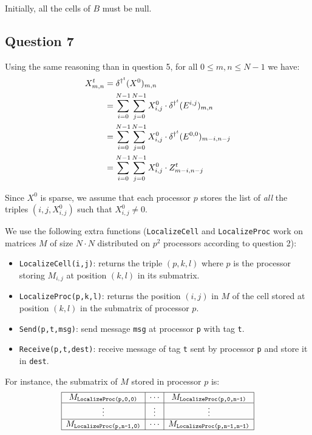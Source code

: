 Initially, all the cells of $B$ must be null.
\fi


\subsection*{Question 7}

Using the same reasoning than in question 5, for all $0 \leq m, n \leq N-1$ we have:
\begin{equation}
 \label{qsevenrel}
 \begin{split}
    X^t_{m,n} & = \delta^{\dag^t} (X^0)_{m,n} \\
              & = \sum_{i=0}^{N-1} \sum_{j=0}^{N-1} X^0_{i,j} \cdot \delta^{\dag^t} (E^{i,j})_{m,n} \\
              & = \sum_{i=0}^{N-1} \sum_{j=0}^{N-1} X^0_{i,j} \cdot \delta^{\dag^t} (E^{0,0})_{m-i,n-j} \\
              & = \sum_{i=0}^{N-1} \sum_{j=0}^{N-1} X^0_{i,j} \cdot Z^t_{m-i,n-j} \\
 \end{split}
\end{equation}

Since $X^0$ is sparse, we assume that each processor $p$ stores the list of \textit{all} the triples $(i,j,X^0_{i,j})$ such that $X^0_{i,j} \neq 0$.


We use the following extra functions (\texttt{LocalizeCell} and \texttt{LocalizeProc} work on matrices $M$ of size $N \cdot N$ distributed on $p^2$ processors according to question 2):
\begin{itemize}
 \item \texttt{LocalizeCell(i,j)}: returns the triple $(p,k,l)$ where $p$ is the processor storing $M_{i,j}$ at position $(k,l)$ in its submatrix.
 \item \texttt{LocalizeProc(p,k,l)}: returns the position $(i,j)$ in $M$ of the cell stored at position $(k,l)$ in the submatrix of processor $p$.
 \item \texttt{Send(p,t,msg)}: send message \texttt{msg} at processor \texttt{p} with tag \texttt{t}.
 \item \texttt{Receive(p,t,dest)}: receive message of tag \texttt{t} sent by processor \texttt{p} and store it in \texttt{dest}.
\end{itemize}

For instance, the submatrix of $M$ stored in processor $p$ is:
\[
   \begin{array}{ | c | c | c |} \hline
    M_{\texttt{LocalizeProc(p,0,0)}} & \cdots & M_{\texttt{LocalizeProc(p,0,n-1)}}\\ \hline
    \vdots & \vdots & \vdots \\ \hline
    M_{\texttt{LocalizeProc(p,n-1,0)}} & \cdots & M_{\texttt{LocalizeProc(p,n-1,n-1)}}\\ \hline
  \end{array}
\]


